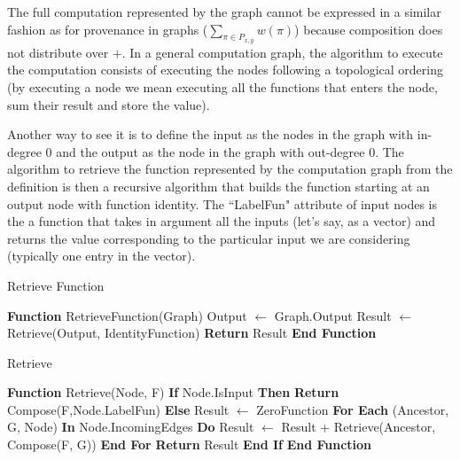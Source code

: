 \documentclass[11pt,a4paper]{article}
\begin{document}
	The full computation represented by the graph cannot be expressed in a similar fashion as for provenance in graphs ($\underset{\pi \in P_{x,y}}{\sum} w(\pi)$) because composition does not distribute over $+$. In a general computation graph, the algorithm to execute the computation consists of executing the nodes following a topological ordering (by executing a node we mean executing all the functions that enters the node, sum their result and store the value).

	Another way to see it is to define the input as the nodes in the graph with in-degree 0 and the output as the node in the graph with out-degree 0. The algorithm to retrieve the function represented by the computation graph from the definition is then a recursive algorithm that builds the function starting at an output node with function identity. The ``LabelFun" attribute of input nodes is the a function that takes in argument all the inputs (let's say, as a vector) and returns the value corresponding to the particular input we are considering (typically one entry in the vector). \\

	\begin{algorithm}
	\caption{Retrieve Function}
	\label{alg:retrieve_function}
	\begin{algorithmic}[1]
	\STATE \textbf{Function} RetrieveFunction(Graph)
	\STATE \hspace{1em} Output $\leftarrow$ Graph.Output
	\STATE \hspace{1em} Result $\leftarrow$ Retrieve(Output, IdentityFunction)
	\STATE \hspace{1em} \textbf{Return} Result
	\STATE \textbf{End Function}
	\end{algorithmic}
	\end{algorithm}

	\begin{algorithm}
	\caption{Retrieve}
	\label{alg:retrieve}
	\begin{algorithmic}[1]
	\STATE \textbf{Function} Retrieve(Node, F)
	\STATE \hspace{1em} \textbf{If} Node.IsInput \textbf{Then}
	\STATE \hspace{2em} \textbf{Return} Compose(F,Node.LabelFun)
	\STATE \hspace{1em} \textbf{Else}
	\STATE \hspace{2em} Result $\leftarrow$ ZeroFunction
	\STATE \hspace{2em} \textbf{For Each} (Ancestor, G, Node) \textbf{In} Node.IncomingEdges \textbf{Do}
	\STATE \hspace{3em} Result $\leftarrow$ Result + Retrieve(Ancestor, Compose(F, G))
	\STATE \hspace{2em} \textbf{End For}
	\STATE \hspace{2em} \textbf{Return} Result
	\STATE \hspace{1em} \textbf{End If}
	\STATE \textbf{End Function}
	\end{algorithmic}
	\end{algorithm}
\end{document}
